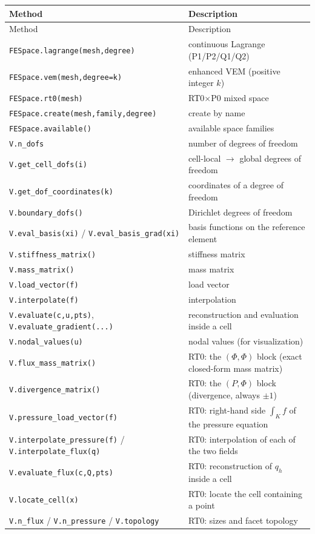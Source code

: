 \documentclass[11pt,oneside]{book}
\theoremstyle{definition}
\theoremstyle{plain}
\newcommand{\code}[1]{\texttt{#1}}
\begin{document}
\begingroup\small
\begin{longtable}{@{}L{5.0cm}L{9.4cm}@{}}
\toprule
Method & Description \\
\midrule
\endfirsthead
\toprule
Method & Description \\
\midrule
\endhead
\code{FESpace.lagrange(mesh,\allowbreak  degree)} & continuous Lagrange (P1/P2/Q1/Q2) \\
\code{FESpace.vem(mesh,\allowbreak  degree=k)} & enhanced VEM (positive integer $k$) \\
\code{FESpace.rt0(mesh)} & RT0$\times$P0 mixed space \\
\code{FESpace.create(mesh,\allowbreak  family,\allowbreak  degree)} & create by name \\
\code{FESpace.available()} & available space families \\
\code{V.n\_\allowbreak dofs} & number of degrees of freedom \\
\code{V.get\_\allowbreak cell\_\allowbreak dofs(i)} & cell-local $\to$ global degrees of freedom \\
\code{V.get\_\allowbreak dof\_\allowbreak coordinates(k)} & coordinates of a degree of freedom \\
\code{V.boundary\_\allowbreak dofs()} & Dirichlet degrees of freedom \\
\code{V.eval\_\allowbreak basis(xi)} / \code{V.eval\_\allowbreak basis\_\allowbreak grad(xi)} & basis functions on the reference element \\
\code{V.stiffness\_\allowbreak matrix()} & stiffness matrix \\
\code{V.mass\_\allowbreak matrix()} & mass matrix \\
\code{V.load\_\allowbreak vector(f)} & load vector \\
\code{V.interpolate(f)} & interpolation \\
\code{V.evaluate(c,\allowbreak  u,\allowbreak  pts)}, \code{V.evaluate\_\allowbreak gradient(...)} & reconstruction and evaluation inside a cell \\
\code{V.nodal\_\allowbreak values(u)} & nodal values (for visualization) \\
\midrule
\code{V.flux\_\allowbreak mass\_\allowbreak matrix()} & RT0: the $(\Phi,\Phi)$ block (exact closed-form mass matrix) \\
\code{V.divergence\_\allowbreak matrix()} & RT0: the $(P,\Phi)$ block (divergence, always $\pm1$) \\
\code{V.pressure\_\allowbreak load\_\allowbreak vector(f)} & RT0: right-hand side $\int_K f$ of the pressure equation \\
\code{V.interpolate\_\allowbreak pressure(f)} / \code{V.interpolate\_\allowbreak flux(q)} & RT0: interpolation of each of the two fields \\
\code{V.evaluate\_\allowbreak flux(c,\allowbreak  Q,\allowbreak  pts)} & RT0: reconstruction of $q_h$ inside a cell \\
\code{V.locate\_\allowbreak cell(x)} & RT0: locate the cell containing a point \\
\code{V.n\_\allowbreak flux} / \code{V.n\_\allowbreak pressure} / \code{V.topology} & RT0: sizes and facet topology \\
\bottomrule
\end{longtable}
\end{document}
